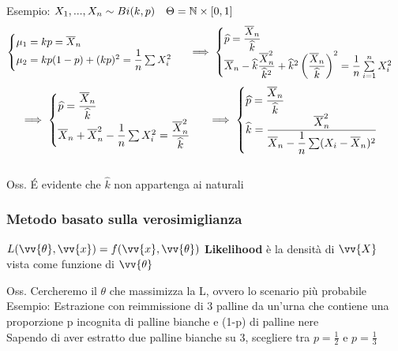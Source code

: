 Esempio: $X_1,...,X_n \sim Bi(k,p) \ \ \ \Theta = \mathbb N \times [0,1]$
\[\begin{cases}
    \mu_1=kp=\overline{X}_n\\
    \mu_2=kp(1-p) + (kp)^2 = \dfrac{1}{n}\sum X_i^2
\end{cases} \ \implies  \begin{cases}
    \widehat{p}=\dfrac{\overline{X}_n}{\widehat{k}}\\
    \overline{X}_n - \widehat{k}\dfrac{\overline{X}^2_n}{\widehat{k}^2} + \widehat{k}^2\left(\dfrac{\overline{X}_n}{\widehat{k}}\right)^2 = \dfrac{1}{n}\sum\limits_{i=1}^{n}X_i^2 \end{cases}  \]\[ \implies \begin{cases}
        \hat{p}= \frac{\overline{X}_n}{\hat{k}}\\
        \overline{X}_n+\overline{X}_n^2 -\frac{1}{n}\sum X_i^2 = \frac{\overline{X}_n^2}{\hat{k}}
    \end{cases} \ \implies \begin{cases}
        \hat{p}= \frac{\overline{X}_n}{\Hat{k}}\\
        \hat{k}=\frac{\overline{X}_n^2}{\overline{X}_n-\frac{1}{n}\sum (X_i-\overline{X}_n)^2}
    \end{cases}\]\\   
Oss. É evidente che $\hat{k}$ non appartenga ai naturali\\





\subsubsection{Metodo basato sulla verosimiglianza}

\begin{defi}
$L(\vv{\theta},\vv{x})=f(\vv{x},\vv{\theta})$ \textbf{Likelihood} è la densità di $\vv{X}$ vista come funzione di $\vv{\theta}$
\end{defi}

Oss. Cercheremo il $\theta$ che massimizza la L, ovvero lo scenario più probabile\\

Esempio: Estrazione con reimmissione di 3 palline da un'urna che contiene una proporzione p incognita di palline bianche e (1-p) di palline nere\\
Sapendo di aver estratto due palline bianche su 3, scegliere tra $p=\frac{1}{2}$ e $p=\frac{1}{3}$\\

